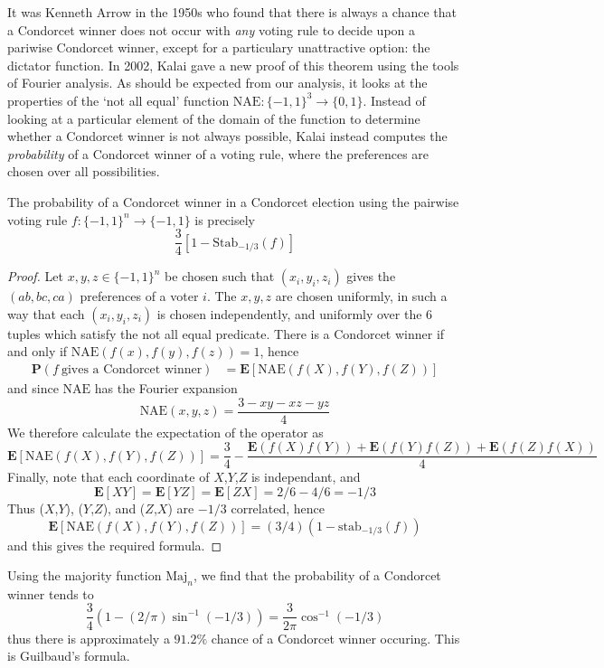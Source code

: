 It was Kenneth Arrow in the 1950s who found that there is always a chance that a Condorcet winner does not occur with {\it any} voting rule to decide upon a pariwise Condorcet winner, except for a particulary unattractive option: the dictator function. In 2002, Kalai gave a new proof of this theorem using the tools of Fourier analysis. As should be expected from our analysis, it looks at the properties of the `not all equal' function $\text{NAE}: \{ -1, 1 \}^3 \to \{ 0, 1 \}$. Instead of looking at a particular element of the domain of the function to determine whether a Condorcet winner is not always possible, Kalai instead computes the {\it probability} of a Condorcet winner of a voting rule, where the preferences are chosen over all possibilities. 

\begin{lemma}
    The probability of a Condorcet winner in a Condorcet election using the pairwise voting rule $f: \{ -1, 1 \}^n \to \{ -1, 1 \}$ is precisely
    \[ \frac{3}{4} [1 - \text{Stab}_{-1/3}(f)] \]
\end{lemma}
\begin{proof}
    Let $x,y,z \in \{ -1, 1 \}^n$ be chosen such that $(x_i,y_i,z_i)$ gives the $(ab,bc,ca)$ preferences of a voter $i$. The $x,y,z$ are chosen uniformly, in such a way that each $(x_i,y_i,z_i)$ is chosen independently, and uniformly over the 6 tuples which satisfy the not all equal predicate. There is a Condorcet winner if and only if $\text{NAE}(f(x),f(y),f(z)) = 1$, hence
    \begin{align*}
        \mathbf{P}(f\ \text{gives a Condorcet winner}) &= \mathbf{E}[\text{NAE}(f(X),f(Y),f(Z))]
    \end{align*}
    and since $\text{NAE}$ has the Fourier expansion
    \[ \text{NAE}(x,y,z) = \frac{3 - xy - xz - yz}{4} \]
    We therefore calculate the expectation of the operator as
    \[ \mathbf{E}[\text{NAE}(f(X),f(Y),f(Z))] = \frac{3}{4} - \frac{\mathbf{E}(f(X)f(Y)) + \mathbf{E}(f(Y)f(Z)) + \mathbf{E}(f(Z)f(X))}{4} \]
    Finally, note that each coordinate of $X$,$Y$,$Z$ is independant, and
    \[ \mathbf{E}[XY] = \mathbf{E}[YZ] = \mathbf{E}[ZX] = 2/6 - 4/6 = -1/3 \]
    Thus ($X$,$Y$), ($Y$,$Z$), and ($Z$,$X$) are $-1/3$ correlated, hence
    \[ \mathbf{E}[\text{NAE}(f(X),f(Y),f(Z))] = (3/4)(1 - \text{stab}_{-1/3}(f)) \]
    and this gives the required formula.
\end{proof}

\begin{example}
    Using the majority function $\text{Maj}_n$, we find that the probability of a Condorcet winner tends to
    \[ \frac{3}{4}(1 - (2/\pi) \sin^{-1}(-1/3)) = \frac{3}{2\pi} \cos^{-1}(-1/3) \]
    thus there is approximately a $91.2\%$ chance of a Condorcet winner occuring. This is Guilbaud's formula.
\end{example}


